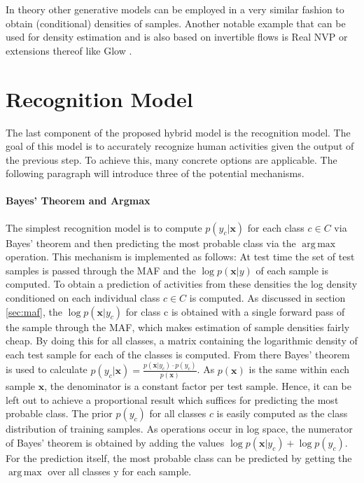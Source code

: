 \documentclass[11pt,titlepage,oneside,openany]{book}
\DeclareMathOperator*{\argmax}{arg\,max}
\begin{document}
In theory other generative models can be employed in a very similar fashion to obtain (conditional) densities of samples. Another notable example that can be used for density estimation and is also based on invertible flows is Real NVP \cite{dinh_density_2017} or extensions thereof like Glow \cite{kingma_glow_2018}.

\section{Recognition Model}
The last component of the proposed hybrid model is the recognition model. The goal of this model is to accurately recognize human activities given the output of the previous step. To achieve this, many concrete options are applicable. The following paragraph will introduce three of the potential mechanisms.

\paragraph{Bayes' Theorem and Argmax}
The simplest recognition model is to compute $p(y_c|\pmb{x})$ for each class $c \in C$ via Bayes' theorem and then predicting the most probable class via the $\argmax$ operation. This mechanism is implemented as follows: At test time the set of test samples is passed through the MAF and the $\log p(\pmb{x}|y)$ of each sample is computed. To obtain a prediction of activities from these densities the log density conditioned on each individual class $c \in C$ is computed. As discussed in section \ref{sec:maf}, the $\log p(\pmb{x}|y_c)$ for class c is obtained with a single forward pass of the sample through the MAF, which makes estimation of sample densities fairly cheap. By doing this for all classes, a matrix containing the logarithmic density of each test sample for each of the classes is computed. From there Bayes' theorem is used to calculate $p(y_c|\pmb{x}) = \frac{p(\pmb{x}|y_c) \cdot p(y_c)}{p(\pmb{x})}$. As $p(\pmb{x})$ is the same within each sample $\pmb{x}$, the denominator is a constant factor per test sample. Hence, it can be left out to achieve a proportional result which suffices for predicting the most probable class. The prior $p(y_c)$ for all classes $c$ is easily computed as the class distribution of training samples. As operations occur in log space, the numerator of Bayes' theorem is obtained by adding the values $\log p(\pmb{x}|y_c) + \log p(y_c)$. For the prediction itself, the most probable class can be predicted by getting the $\argmax$ over all classes y for each sample.
\end{document}
